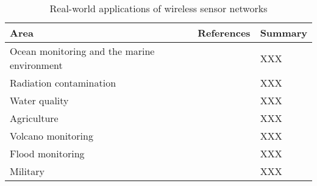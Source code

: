 \begin{table}[h]
	\footnotesize
	\begin{tabular}{|p{}|p{}|p{}|}
		\hline
		Area & References & Summary \\
		\hline
		Ocean monitoring and the marine environment & \cite{Mahdy2008a, Albaladejo2010, 6973877} & XXX \\
		Radiation contamination & \cite{Gomez2015} & XXX \\
		Water quality & \cite{Fang2010} & XXX \\
		Agriculture  & \cite{8745854} & XXX \\
		Volcano monitoring  & \cite{Werner-Allen2006} & XXX \\
		Flood monitoring  & \cite{Castillo-effen2004} & XXX \\
		Military & \cite{6268958} & XXX \\
		\hline
	\end{tabular}
	\caption{Real-world applications of wireless sensor networks}
	\label{table:applications}	
\end{table}
